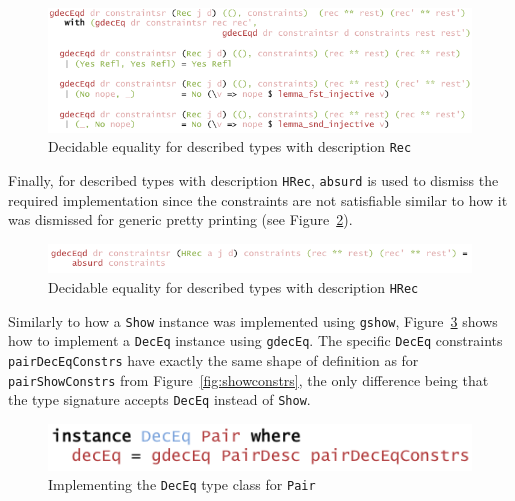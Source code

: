 \documentclass{ituthesis}
\newcommand{\ttconstructor}[1]{\textcolor{constructor-color}{\texttt{#1}}}
\newcommand{\tttype}[1]{\textcolor{type-color}{\texttt{#1}}}
\newcommand{\ttdec}[1]{\textcolor{declared-var-color}{\texttt{#1}}}
\theoremstyle{break}
\begin{document}
\begin{figure}[ht]
\begin{center}
    \includegraphics[scale=0.5]{Figures/GenericDecEqDesc3.png}
\end{center}
\caption{Decidable equality for described types with description \ttconstructor{Rec}}
\label{fig:deceqgendesc3}
\end{figure}

Finally, for described types with description \ttconstructor{HRec}, \ttdec{absurd} is used to dismiss the required implementation since the constraints are not satisfiable similar to
how it was dismissed for generic pretty printing (see Figure~\ref{fig:deceqgendesc4}).

\begin{figure}[ht]
\begin{center}
    \includegraphics[scale=0.5]{Figures/GenericDecEqDesc4.png}
\end{center}
\caption{Decidable equality for described types with description \ttconstructor{HRec}}
\label{fig:deceqgendesc4}
\end{figure}

Similarly to how a \tttype{Show} instance was implemented using \ttdec{gshow}, Figure~\ref{fig:deceqinst} shows how to implement a \tttype{DecEq} instance using
\ttdec{gdecEq}. The specific \tttype{DecEq} constraints \ttdec{pairDecEqConstrs} have exactly the same shape of definition as for \ttdec{pairShowConstrs} from Figure~\ref{fig:showconstrs}, the only difference
being that the type signature accepts \tttype{DecEq} instead of \tttype{Show}.

\begin{figure}[ht]
\begin{center}
    \includegraphics[scale=0.5]{Figures/GenericDecEqInstance.png}
\end{center}
\caption{Implementing the \tttype{DecEq} type class for \ttdec{Pair}}
\label{fig:deceqinst}
\end{figure}
\end{document}
